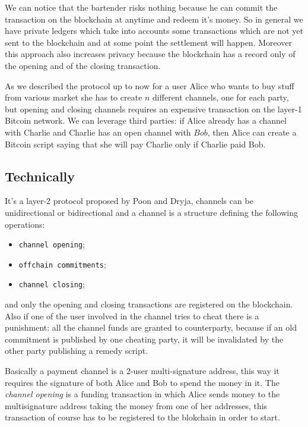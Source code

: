 We can notice that the bartender risks nothing because he can commit the transaction on the blockchain at anytime and redeem it's money.
So in general we have private ledgers which take into accounts some transactions which are not yet sent to the blockchain and at some point the settlement will happen.
Moreover this approach also increases privacy because the blockchain has a record only of the opening and of the closing transaction.

As we described the protocol up to now for a user Alice who wants to buy stuff from various market she has to create $n$ different channels, one for each party, but opening and closing channels requires an expensive transaction on the layer-1 Bitcoin network.
We can leverage third parties: if Alice already has a channel with Charlie and Charlie has an open channel with $Bob$, then Alice can create a Bitcoin script saying that she will pay Charlie only if Charlie paid Bob.

\subsection{Technically}
It's a layer-2 protocol proposed by Poon and Dryja, channels can be unidirectional or bidirectional and a channel is a structure defining the following operations:
\begin{itemize}
    \item \verb|channel opening|;
    \item \verb|offchain commitments|;
    \item \verb|channel closing|;
\end{itemize}
and only the opening and closing transactions are registered on the blockchain.
Also if one of the user involved in the channel tries to cheat there is a punishment: all the channel funds are granted to counterparty, because if an old commitment is published by one cheating party, it will be invalidated by the other party publishing a remedy script.

Basically a payment channel is a 2-user multi-signature address, this way it requires the signature of both Alice and Bob to spend the money in it.
The \emph{channel opening} is a funding transaction in which Alice sends money to the multisignature address taking the money from one of her addresses, this transaction of course has to be registered to the blokchain in order to start.

